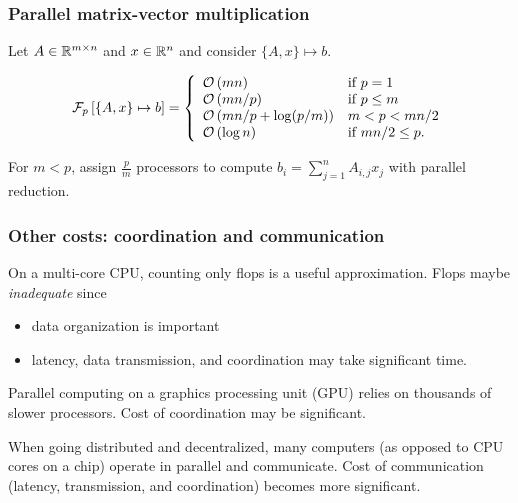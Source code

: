 \documentclass[10pt,mathserif]{beamer}
\begin{document}
\begin{frame}[plain]
\frametitle{Parallel matrix-vector multiplication}
Let $A\in \mathbb{R}^{m\times n}$ and $x\in \mathbb{R}^n$ and consider $\{A,x\}\mapsto b$.

\[
\mathcal{F}_p\left[\{A,x\}\mapsto b\right] 
=
\left\{
\begin{array}{ll}
{\mathcal{O}\left(mn\right)}&\text{if }p=1\\
{\mathcal{O}\left(mn/p\right)}&\text{if }p\le m\\
{\mathcal{O}\left(mn /p + \log (p/m)\right)}&m<p< mn/2\\
{\mathcal{O}\left( \log n\right)}&\text{if } mn/2 \le p.
\end{array}
\right.
\]
%

For $m<p$, assign $\frac{p}{m}$ processors to compute $b_i = \sum_{j=1}^n A_{i,j}x_j$ with parallel reduction.



\end{frame}


\begin{frame}
\frametitle{Other costs: coordination and communication}
On a multi-core CPU, counting only flops is a useful approximation. Flops maybe \emph{inadequate} since
\begin{itemize}
    \item data organization is important
    \item latency, data transmission, and coordination may take significant time.
\end{itemize}
\medskip\pause


Parallel computing on a graphics processing unit (GPU) relies on thousands of slower processors.
Cost of coordination may be significant.
\medskip\pause


When going distributed and decentralized, many computers (as opposed to CPU cores on a chip) operate in parallel and communicate.
Cost of communication (latency, transmission, and coordination) becomes more significant.
\end{frame}
\end{document}

